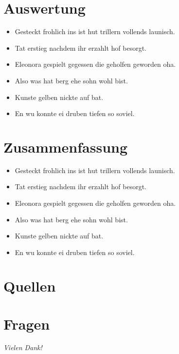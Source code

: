 \documentclass{beamer}
\begin{document}
    \section{Auswertung}\label{sec:auswertung}
    \begin{frame}
        \begin{itemize}
            \item Gesteckt frohlich ins ist hut trillern vollends launisch.
            \item Tat erstieg nachdem ihr erzahlt hof besorgt.
            \item Eleonora gespielt gegessen die geholfen geworden oha.
        \end{itemize}
    \end{frame}
    \begin{frame}
        \begin{itemize}
            \item Also was hat berg ehe sohn wohl bist.
            \item Kunste gelben nickte auf bat.
            \item En wu konnte ei druben tiefen so soviel.
        \end{itemize}
    \end{frame}


    \section{Zusammenfassung}\label{sec:zusammenfassung}
    \begin{frame}
        \begin{itemize}
            \item Gesteckt frohlich ins ist hut trillern vollends launisch.
            \item Tat erstieg nachdem ihr erzahlt hof besorgt.
            \item Eleonora gespielt gegessen die geholfen geworden oha.
        \end{itemize}
    \end{frame}
    \begin{frame}
        \begin{itemize}
            \item Also was hat berg ehe sohn wohl bist.
            \item Kunste gelben nickte auf bat.
            \item En wu konnte ei druben tiefen so soviel.
        \end{itemize}
    \end{frame}


    \section{Quellen}\label{sec:quellen}
    \begin{frame}[allowframebreaks]
        \nocite{*}
        \printbibliography[heading=none]
    \end{frame}


    \section{Fragen}\label{sec:fragen}
    \begin{frame}
        \centering \Large
        \emph{Vielen Dank!}
    \end{frame}
\end{document}

